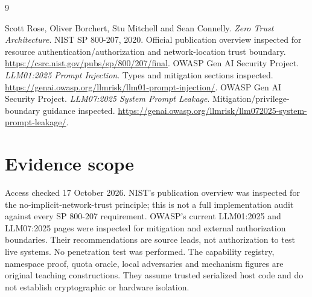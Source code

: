 \begin{thebibliography}{9}
 Scott Rose, Oliver Borchert, Stu Mitchell and Sean Connelly.
\emph{Zero Trust Architecture}. NIST SP 800-207, 2020. Official publication
overview inspected for resource authentication/authorization and network-location
trust boundary.
\url{https://csrc.nist.gov/pubs/sp/800/207/final}.
 OWASP Gen AI Security Project.
\emph{LLM01:2025 Prompt Injection}. Types and mitigation sections inspected.
\url{https://genai.owasp.org/llmrisk/llm01-prompt-injection/}.
 OWASP Gen AI Security Project.
\emph{LLM07:2025 System Prompt Leakage}. Mitigation/privilege-boundary guidance
inspected. \url{https://genai.owasp.org/llmrisk/llm072025-system-prompt-leakage/}.
\end{thebibliography}

\section*{Evidence scope}
Access checked 17 October 2026. NIST's publication overview was inspected for
the no-implicit-network-trust principle; this is not a full implementation
audit against every SP 800-207 requirement. OWASP's current LLM01:2025 and
LLM07:2025 pages were inspected for mitigation and external authorization
boundaries. Their recommendations are source leads, not authorization to test
live systems. No penetration test was performed. The capability registry,
namespace proof, quota oracle, local adversaries and mechanism figures are
original teaching constructions. They assume trusted serialized
host code and do not establish cryptographic or hardware isolation.
